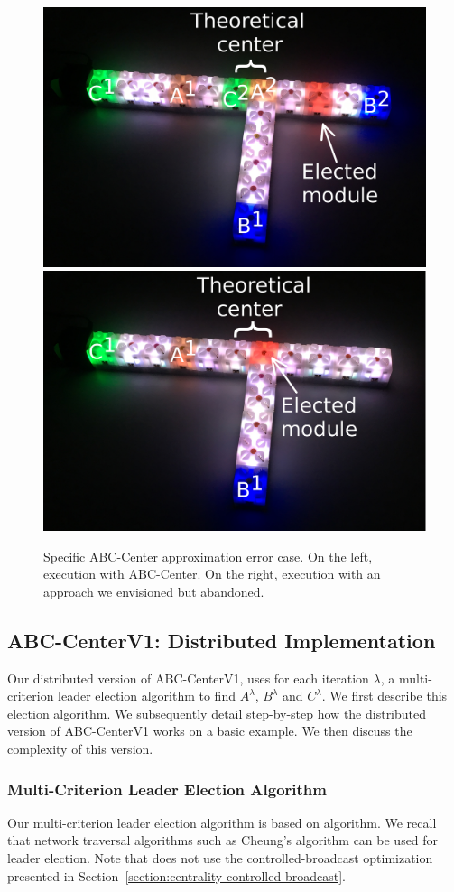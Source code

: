 \begin{figure}[!h]
	\centering
	\includegraphics[width=0.4\linewidth]{images/centrality/abc-centerv2-tricky-case/v1-cropped-annotated}
	\includegraphics[width=0.4\linewidth]{images/centrality/abc-centerv2-tricky-case/v2-cropped-annotated}\\
	\caption{Specific ABC-Center approximation error case. On the left, execution with ABC-Center. On the right, execution with an approach we envisioned but abandoned.\label{fig:centrality:ABC-Center-error-case}}
\end{figure}

\subsection{ABC-CenterV1: Distributed Implementation}
\label{section:centrality:abc-implementation}

Our distributed version of ABC-CenterV1, uses for each iteration $\lambda$, a multi-criterion leader election algorithm to find $A^\lambda$, $B^\lambda$ and $C^\lambda$. We first describe this election algorithm. We subsequently detail step-by-step how the distributed version of ABC-CenterV1 works on a basic example. We then discuss the complexity of this version.

\subsubsection{Multi-Criterion Leader Election Algorithm}

Our multi-criterion leader election algorithm is based on \cheung{} algorithm. We recall that network traversal algorithms such as Cheung's algorithm can be used for leader election. Note that \cheung{} does not use the controlled-broadcast optimization presented in Section~\ref{section:centrality-controlled-broadcast}.

